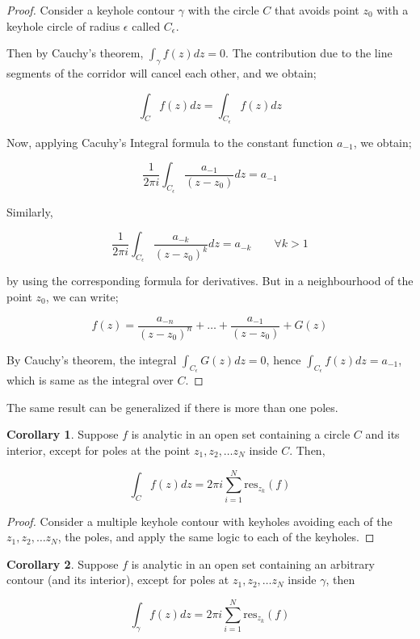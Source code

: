 \documentclass[12pt]{article}
\theoremstyle{definition}
\newtheorem{cor}{Corollary}
\newenvironment{corollary}{
\begin{tcolorbox}[colback=blue!5!white,colframe=blue!75!black, parbox = false]\begin{cor} }{\end{cor}\end{tcolorbox} }
\begin{document}
\begin{proof}
    Consider a keyhole contour $\gamma$ with the circle $C$ that avoids point $z_0$ with a keyhole circle of radius $\epsilon$ called $C_\epsilon$.

    Then by Cauchy's theorem, $\int_\gamma f(z)dz = 0$. The contribution due to the line segments of the corridor will cancel each other, and we obtain;

    $$
    \int_C f(z)dz = \int_{C_\epsilon} f(z)dz
    $$

    Now, applying Cacuhy's Integral formula to the constant function $a_{-1}$, we obtain;

    $$
    \dfrac{1}{2\pi i} \int_{C_\epsilon} \dfrac{a_{-1}}{(z - z_0)}dz = a_{-1}
    $$

    Similarly, 
    
    $$
    \dfrac{1}{2\pi i} \int_{C_\epsilon} \dfrac{a_{-k}}{(z - z_0)^k}dz = a_{-k} \qquad \forall k > 1
    $$

    by using the corresponding formula for derivatives. But in a neighbourhood of the point $z_0$, we can write;

    $$
    f(z) = \dfrac{a_{-n}}{(z - z_0)^n} + \dots + \dfrac{a_{-1}}{(z - z_0)} + G(z)
    $$

    By Cauchy's theorem, the integral $\int_{C_\epsilon}G(z) dz = 0$, hence $\int_{C_\epsilon} f(z)dz = a_{-1}$, which is same as the integral over $C$.
\end{proof}

The same result can be generalized if there is more than one poles.

\begin{corollary}
    Suppose $f$ is analytic in an open set containing a circle $C$ and its interior, except for poles at the point $z_1, z_2, \dots z_N$ inside $C$. Then,

    $$
    \int_C f(z)dz = 2\pi i \sum_{i=1}^{N} \text{res}_{z_k}(f)
    $$
\end{corollary}

\begin{proof}
    Consider a multiple keyhole contour with keyholes avoiding each of the $z_1, z_2, \dots z_N$, the poles, and apply the same logic to each of the keyholes.
\end{proof}

\begin{corollary}
    Suppose $f$ is analytic in an open set containing an arbitrary contour (and its interior), except for poles at $z_1, z_2, \dots z_N$ inside $\gamma$, then 

    $$
    \int_\gamma f(z)dz = 2\pi i \sum_{i=1}^{N} \text{res}_{z_k}(f)
    $$
\end{corollary}
\end{document}
